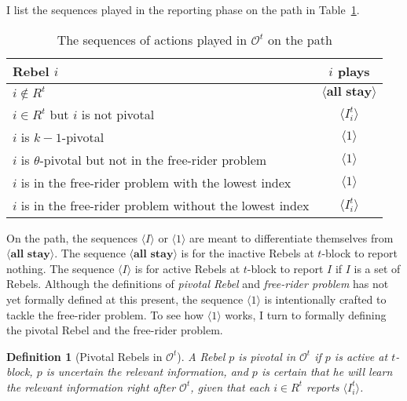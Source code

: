 \documentclass[12pt,letter]{article}
\newcommand{\Omicron}{\mathcal{O}}
\newtheorem{definition}{Definition}[section]
\theoremstyle{definition}
\theoremstyle{remark}
\theoremstyle{claim}
\begin{document}
I list the sequences played in the reporting phase on the path in Table~\ref{Table_msg_RP_path}.

\begin{table}[!htbp]
\caption{The sequences of actions played in $\Omicron^t$ on the path}
\label{Table_msg_RP_path}
\begin{center}
\begin{tabular}{l c}
Rebel $i$ & $i$ plays\\
\hline
\hline
$i\notin R^t$				& $\langle \textbf{all stay} \rangle$  \\
$i\in R^t$ but $i$ is not pivotal	 					 			& $\langle I^t_i \rangle$  \\
$i$ is $k-1$-pivotal	 					 			& $\langle 1 \rangle$  \\
$i$ is $\theta$-pivotal but not in the free-rider problem	 					 			& $\langle 1 \rangle$  \\
$i$ is in the free-rider problem with the lowest index	 					 			& $\langle 1 \rangle$  \\
$i$ is in the free-rider problem without the lowest index	 					 			& $\langle I^t_i \rangle$  \\
\hline
\end{tabular}
\end{center}
\end{table}

On the path, the sequences $\langle I \rangle$ or $\langle 1 \rangle$ are meant to differentiate themselves from $\langle \textbf{all stay} \rangle$. The sequence $\langle \textbf{all stay} \rangle$ is for the inactive Rebels at $t$-block to report nothing. The sequence $\langle I \rangle$ is for active Rebels at $t$-block to report $I$ if $I$ is a set of Rebels. Although the definitions of \textit{pivotal Rebel} and \textit{free-rider problem} has not yet formally defined at this present, the sequence $\langle 1 \rangle$ is intentionally crafted to tackle the free-rider problem. To see how $\langle 1 \rangle$ works, I turn to formally defining the {pivotal Rebel} and the {free-rider problem}. 

\begin{definition}[Pivotal Rebels in $\Omicron^t$]
A Rebel $p$ is pivotal in $\Omicron^t$ if $p$ is active at $t$-block, $p$ is uncertain the relevant information, and $p$ is certain that he will learn the relevant information right after $\Omicron^t$, given that each $i\in R^t$ reports $\langle I^t_i \rangle$.
\end{definition}
\end{document}
